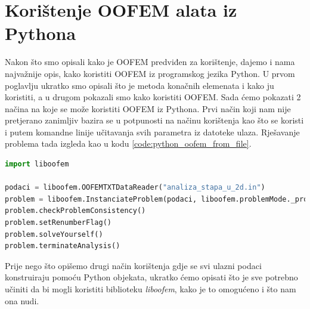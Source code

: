 \documentclass[a4paper,twoside,12pt]{memoir} %
\begin{document}



\section{Korištenje OOFEM alata iz Pythona}
\label{poglavlje:koristenje_pythona}
Nakon što smo opisali kako je OOFEM predviđen za korištenje, dajemo i nama najvažnije opis, kako koristiti OOFEM iz programskog jezika Python. U prvom poglavlju ukratko smo opisali što je metoda konačnih elemenata i kako ju koristiti, a u drugom pokazali smo kako koristiti OOFEM. Sada ćemo pokazati 2 načina na koje se može koristiti OOFEM iz Pythona. Prvi način koji nam nije pretjerano zanimljiv bazira se u potpunosti na načinu korištenja kao što se koristi i putem komandne linije učitavanja svih parametra iz datoteke ulaza. Rješavanje problema tada izgleda kao u kodu \ref{code:python_oofem_from_file}.

\begin{lstlisting}[language=python, label={code:python_oofem_from_file}, caption={Pokretanje OOFEM alata pomoću Pythona i učitavanje ulaznih podataka iz datoteke}, label={code:python_oofem_from_file}]
import liboofem

podaci = liboofem.OOFEMTXTDataReader("analiza_stapa_u_2d.in")
problem = liboofem.InstanciateProblem(podaci, liboofem.problemMode._processor, 0)
problem.checkProblemConsistency()
problem.setRenumberFlag()
problem.solveYourself()
problem.terminateAnalysis()
\end{lstlisting}

Prije nego što opišemo drugi način korištenja gdje se svi ulazni podaci konstruiraju pomoću Python objekata, ukratko ćemo opisati što je sve potrebno učiniti da bi mogli koristiti biblioteku \textit{liboofem}, kako je to omogućeno i što nam ona nudi. \par
\end{document}
